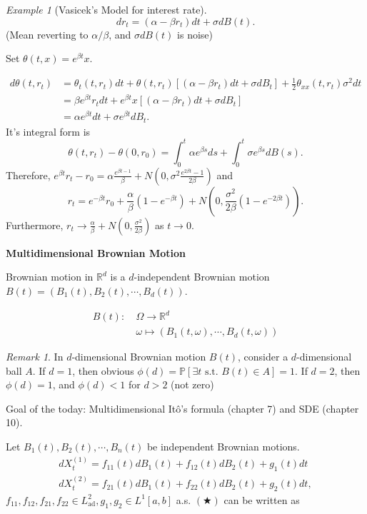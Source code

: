 \documentclass[12pt]{report}
\newcommand{\R}{\mathbb{R}}
\renewcommand{\P}{\mathbb{P}}
\renewcommand{\1}{\mathbb{1}}
\renewcommand{\O}{\Omega}
\theoremstyle{break}
\theoremstyle{newdef}
\theoremstyle{remark}
\newtheorem*{exmp}{Example} %
\newtheorem*{rem}{Remark} %
\begin{document}
\begin{exmp}[Vasicek's Model for interest rate]
$$
dr_t = (\alpha - \beta r_t)dt + \sigma dB(t).
$$
(Mean reverting to $\alpha/\beta$, and $\sigma dB(t)$ is noise)

Set $\theta(t,x) = e^{\beta t}x$.

$$
\begin{aligned}
d\theta(t,r_t)
&= \theta_t(t,r_t)dt + \theta(t,r_t)\left[ (\alpha-\beta r_t)dt + \sigma dB_t \right]
+ \frac12 \theta_{xx}(t,r_t)\sigma^2 dt\\
&= \beta e^{\beta t} r_tdt + e^{\beta t}x[(\alpha-\beta r_t)dt + \sigma dB_t]\\
&= \alpha e^{\beta t}dt + \sigma e^{\beta t}dB_t .
\end{aligned}
$$
It's integral form is
$$
\theta(t,r_t) - \theta(0,r_0)
= \int_0^t \alpha e^{\beta s}ds + \int_0^t \sigma e^{\beta s} dB(s).
$$
Therefore, $e^{\beta t}r_t - r_0 = \alpha \frac{e^{\beta t -1}}{\beta} + N(0, \sigma^2 \frac{e^{2\beta t}-1}{2\beta})$ and
$$
r_t = e^{-\beta t}r_0 + \frac\alpha\beta (1-e^{-\beta t}) + N\left(0, \frac{\sigma^2}{2\beta}(1-e^{-2\beta t})\right).
$$
Furthermore, $r_t \rightarrow \frac\alpha\beta + N(0, \frac{\sigma^2}{2\beta})$ as $t\rightarrow0$.
\end{exmp}




\newpage


\textbf{Multidimensional Brownian Motion}

Brownian motion in $\mathbb{R}^d$ is a $d$-independent Brownian motion $B(t) = (B_1(t), B_2(t), \cdots, B_d(t))$.

$$
\begin{aligned}
B(t) : \ &\O \longrightarrow \R^d\\
&\omega \longmapsto (B_1(t,\omega), \cdots, B_d(t,\omega))
\end{aligned}
$$

\begin{rem}
In $d$-dimensional Brownian motion $B(t)$, consider a $d$-dimensional ball $A$.
If $d = 1$, then obvious $\phi(d) = \P[\exists t \text{ s.t. }B(t) \in A] = 1$.
If $d = 2$, then $\phi(d) = 1$, and $\phi(d) < 1$ for $d > 2$ (not zero)
\end{rem}


\vspace{5mm}


Goal of the today: Multidimensional It\^o's formula (chapter 7) and SDE (chapter 10). 


Let $B_1(t), B_2(t), \cdots, B_n(t)$ be independent Brownian motions.
\begin{equation}
\begin{aligned}
dX_t^{(1)} = f_{11}(t)dB_1(t) + f_{12}(t) dB_2(t) + g_1(t)dt\\
dX_t^{(2)} = f_{21}(t)dB_1(t) + f_{22}(t) dB_2(t) + g_2(t)dt,
\end{aligned}
\tag{$\bigstar$}
\end{equation}
$f_{11}, f_{12}, f_{21}, f_{22} \in L^2_{\text{ad}}, g_1, g_2 \in L^1[a,b]$ a.s.
$(\bigstar)$ can be written as
\end{document}
